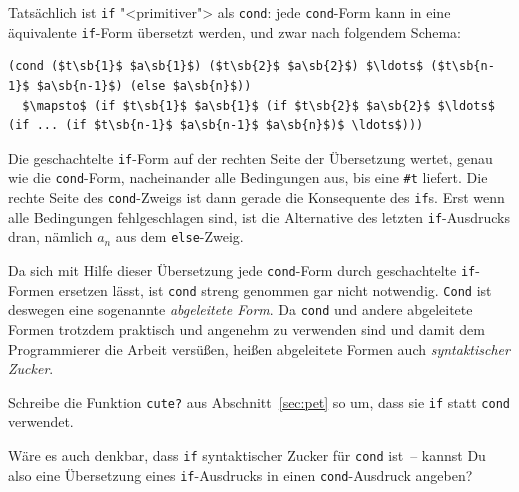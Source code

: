 Tatsächlich ist \lstinline{if} "<primitiver"> als
\lstinline{cond}: jede \lstinline{cond}-Form kann in eine äquivalente
\lstinline{if}-Form übersetzt werden, und zwar nach
folgendem Schema:
%
\begin{lstlisting}
(cond ($t\sb{1}$ $a\sb{1}$) ($t\sb{2}$ $a\sb{2}$) $\ldots$ ($t\sb{n-1}$ $a\sb{n-1}$) (else $a\sb{n}$))
  $\mapsto$ (if $t\sb{1}$ $a\sb{1}$ (if $t\sb{2}$ $a\sb{2}$ $\ldots$ (if ... (if $t\sb{n-1}$ $a\sb{n-1}$ $a\sb{n}$)$ \ldots$)))
\end{lstlisting}
%
Die geschachtelte \lstinline{if}-Form auf der rechten Seite der
Übersetzung wertet, genau wie die \lstinline{cond}-Form, nacheinander
alle Bedingungen aus, bis eine \lstinline{#t} liefert.  Die rechte Seite des
\lstinline{cond}-Zweigs ist dann gerade die Konsequente des \lstinline{if}s.
Erst wenn alle Bedingungen fehlgeschlagen sind, ist die Alternative des letzten
\lstinline{if}-Ausdrucks dran, nämlich $a_n$ aus dem \lstinline{else}-Zweig.

Da sich mit Hilfe dieser Übersetzung jede \lstinline{cond}-Form durch
geschachtelte \lstinline{if}-Formen ersetzen lässt, ist \lstinline{cond}
streng genommen gar nicht notwendig.  \lstinline{Cond} ist deswegen eine
sogenannte \textit{abgeleitete Form}.  Da \lstinline{cond} und andere
abgeleitete Formen trotzdem praktisch und angenehm zu verwenden sind
und damit dem Programmierer die Arbeit versüßen,
heißen abgeleitete Formen auch \textit{syntaktischer
  Zucker}.

\begin{aufgabeinline}
  Schreibe die Funktion \lstinline{cute?} aus Abschnitt~\ref{sec:pet} so
  um, dass sie \lstinline{if} statt  \lstinline{cond} verwendet.
\end{aufgabeinline}
%
\begin{aufgabeinline}
  Wäre es auch denkbar, dass \lstinline{if} syntaktischer Zucker für
  \lstinline{cond} ist~-- kannst Du also eine Übersetzung eines
  \lstinline{if}-Ausdrucks in einen \lstinline{cond}-Ausdruck angeben?
\end{aufgabeinline}

